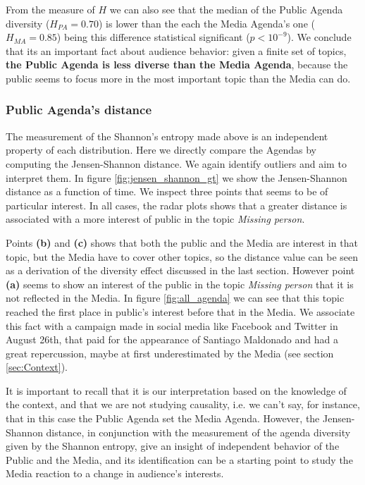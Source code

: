 \par From the measure of $H$ we can also see that the median of the Public Agenda diversity ($H_{PA} = 0.70$) is lower than the each the Media Agenda's one ($H_{MA} = 0.85$) being this difference statistical significant ($p < 10^{-9}$).
We conclude that its an important fact about audience behavior: given a finite set of topics, \textbf{the Public Agenda is less diverse than the Media Agenda}, because the public seems to focus more in the most important topic than the Media can do.

\subsubsection{Public Agenda's distance}


\par The measurement of the Shannon's entropy made above is an independent property of each distribution. 
Here we directly compare the Agendas by computing the Jensen-Shannon distance. We again identify outliers and aim to interpret them.
In figure \ref{fig:jensen_shannon_gt} we show the Jensen-Shannon distance as a function of time. We inspect three points that seems to be of particular interest. In all cases, the radar plots shows that a greater distance is associated with a more interest of public in the topic \emph{Missing person}. 
\par Points \textbf{(b)} and \textbf{(c)} shows that both the public and the Media are interest in that topic, but the Media have to cover other topics, so the distance value can be seen as a derivation of the diversity effect discussed in the last section.
However point \textbf{(a)} seems to show an interest of the public in the topic \emph{Missing person} that it is not reflected in the Media. In figure \ref{fig:all_agenda} we can see that this topic reached the first place in public's interest before that in the Media. We associate this fact with a campaign made in social media like Facebook and Twitter in August 26th, that paid for the appearance of Santiago Maldonado and had a great repercussion, maybe at first underestimated by the Media (see section \ref{sec:Context}). 
\par It is important to recall that it is our interpretation based on the knowledge of the context, and that we are not studying causality, i.e. we can't say, for instance, that in this case the Public Agenda set the Media Agenda. However, the Jensen-Shannon distance, in conjunction with the measurement of the agenda diversity given by the Shannon entropy, give an insight of independent behavior of the Public and the Media, and its identification can be a starting point to study the Media reaction to a change in audience's interests.
 
